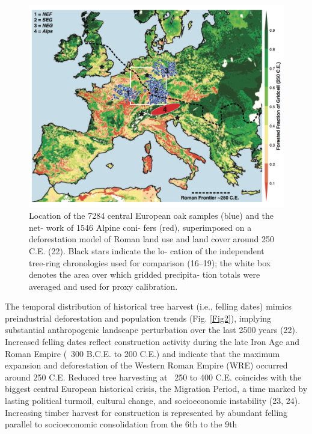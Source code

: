 \documentclass[10pt,a4paper,twoside,onecolumn]{article}
\begin{document}
\begin{myfont}
\begin{multicols}{3}
	\end{multicols}	
\begin{figure}[h] %
\includegraphics[width=1\textwidth]{BuntgenFig1}
\caption{Location of the 7284 central European oak samples (blue) and the net- work of 1546 Alpine coni- fers (red), superimposed on a deforestation model of Roman land use and land cover around 250 C.E. (22). Black stars indicate the lo- cation of the independent tree-ring chronologies used for comparison (16–19); the white box denotes the area over which gridded precipita- tion totals were averaged and used for proxy calibration.} %
\label{Fig1} %
\end{figure} %
	\begin{multicols}{3}
The temporal distribution of historical tree harvest (i.e., felling dates) mimics preindustrial deforestation and population trends (Fig. \ref{Fig2}),
implying substantial anthropogenic landscape perturbation over the last 2500 years (22). Increased felling dates reflect construction activity
during the late Iron Age and Roman Empire (~300 B.C.E. to 200 C.E.) and indicate that the maximum expansion and deforestation of the
Western Roman Empire (WRE) occurred around 250 C.E. Reduced tree harvesting at ~250 to 400 C.E. coincides with the biggest central European
historical crisis, the Migration Period, a time marked by lasting political turmoil, cultural change, and socioeconomic instability (23, 24).
Increasing timber harvest for construction is represented by abundant felling parallel to socioeconomic consolidation from the 6th to the 9th

\end{multicols}
\end{myfont}
\end{document}
